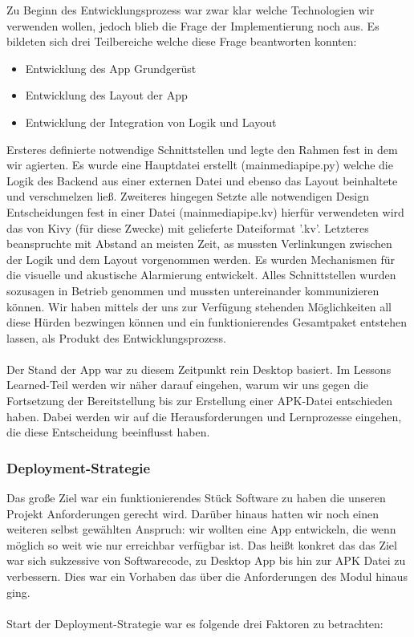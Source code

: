 		Zu Beginn des Entwicklungsprozess war zwar klar welche Technologien wir verwenden wollen, jedoch blieb die Frage der Implementierung noch aus. Es bildeten sich drei Teilbereiche welche diese Frage beantworten konnten:
		\begin{itemize}
			\item Entwicklung des App Grundgerüst
			\item Entwicklung des Layout der App
			\item Entwicklung der Integration von Logik und Layout
		\end{itemize}
		
		\noindent Ersteres definierte notwendige Schnittstellen und legte den Rahmen fest in dem wir agierten. Es wurde eine Hauptdatei erstellt (mainmediapipe.py) welche die Logik des Backend aus einer externen Datei und ebenso das Layout beinhaltete und verschmelzen ließ. Zweiteres hingegen Setzte alle notwendigen Design Entscheidungen fest in einer Datei (mainmediapipe.kv) hierfür verwendeten wird das von Kivy (für diese Zwecke) mit gelieferte Dateiformat '.kv'. Letzteres beanspruchte mit Abstand an meisten Zeit, as mussten Verlinkungen zwischen der Logik und dem Layout vorgenommen werden. Es wurden Mechanismen für die visuelle und akustische Alarmierung entwickelt. Alles Schnittstellen wurden sozusagen in Betrieb genommen und mussten untereinander kommunizieren können. Wir haben mittels der uns zur Verfügung stehenden Möglichkeiten all diese Hürden bezwingen können und ein funktionierendes Gesamtpaket entstehen lassen, als Produkt des Entwicklungsprozess.
		\\\\
		Der Stand der App war zu diesem Zeitpunkt rein Desktop basiert. Im Lessons Learned-Teil werden wir näher darauf eingehen, warum wir uns gegen die Fortsetzung der Bereitstellung bis zur Erstellung einer APK-Datei entschieden haben. Dabei werden wir auf die Herausforderungen und Lernprozesse eingehen, die diese Entscheidung beeinflusst haben.
		
	\subsubsection{Deployment-Strategie}
	\label{sssec:deployment}
		
		Das große Ziel war ein funktionierendes Stück Software zu haben die unseren Projekt Anforderungen gerecht wird. Darüber hinaus hatten wir noch einen weiteren selbst gewählten Anspruch: wir wollten eine App entwickeln, die wenn möglich so weit wie nur erreichbar verfügbar ist. Das heißt konkret das das Ziel war sich sukzessive von Softwarecode, zu Desktop App bis hin zur APK Datei zu verbessern. Dies war ein Vorhaben das über die Anforderungen des Modul hinaus ging.
		\\\\
		Start der Deployment-Strategie war es folgende drei Faktoren zu betrachten:
		
